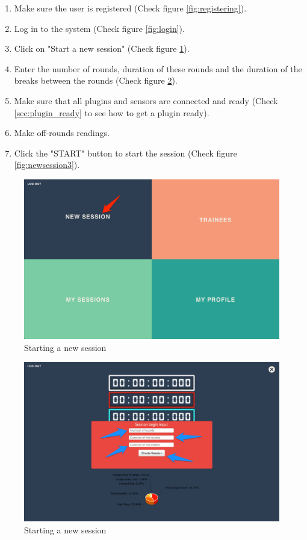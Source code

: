 \begin{enumerate}
\item Make sure the user is registered (Check figure \ref{fig:registering}).
\item Log in to the system (Check figure \ref{fig:login}).
\item Click on "Start a new session" (Check figure \ref{fig:newsession}).
\item Enter the number of rounds, duration of these rounds and the duration of the breaks between the rounds (Check figure \ref{fig:newsession2}).
\item Make sure that all plugins and sensors are connected and ready (Check \ref{sec:plugin_ready} to see how to get a plugin ready).
\item Make off-rounds readings.
\item Click the "START" button to start the session (Check figure \ref{fig:newsession3}).
\end{enumerate}

\begin{figure}[htbp]
\centering 
\includegraphics[width=1.0\linewidth]{steps/NewSession} 
\caption{Starting a new session} 
\label{fig:newsession} 
\end{figure} 

\begin{figure}[htbp]
\centering 
\includegraphics[width=1.0\linewidth]{steps/NewSession2} 
\caption{Starting a new session} 
\label{fig:newsession2} 
\end{figure} 

